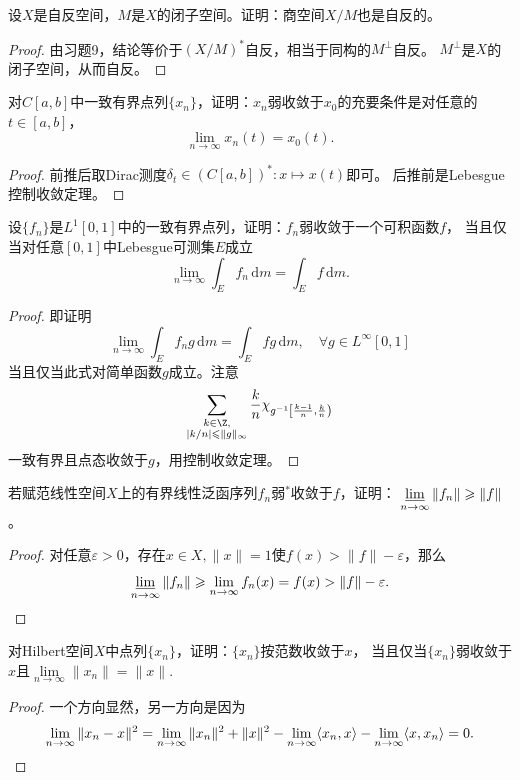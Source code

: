 \begin{11}
    设$X$是自反空间，$M$是$X$的闭子空间。证明：商空间$X/M$也是自反的。
\end{11}
\begin{proof}
    由习题9，结论等价于$(X/M)^*$自反，相当于同构的$M^\perp$自反。
    $M^\perp$是$X$的闭子空间，从而自反。
\end{proof}

\begin{12}
    对$C[a,b]$中一致有界点列$\{x_n\}$，证明：$x_n$弱收敛于$x_0$的充要条件是对任意的$t\in[a,b]$，
    \[\lim_{n\to\infty}x_n(t)=x_0(t).\]
\end{12}
\begin{proof}
    前推后取Dirac测度$\delta_t\in(C[a,b])^*\colon x \mapsto x(t)$即可。
    后推前是Lebesgue控制收敛定理。
\end{proof}

\begin{13}
    设$\{f_n\}$是$L^1[0,1]$中的一致有界点列，证明：$f_n$弱收敛于一个可积函数$f$，
    当且仅当对任意$[0,1]$中Lebesgue可测集$E$成立
    $$\lim_{n\to\infty}\int_Ef_n\,\mathrm{d}m=\int_Ef\,\mathrm{d}m.$$
\end{13}
\begin{proof}
    即证明$$\lim_{n\to\infty}\int_Ef_ng\,\mathrm{d}m=\int_Efg\,\mathrm{d}m,
    \quad\forall g\in L^\infty[0,1]$$
    当且仅当此式对简单函数$g$成立。注意
    $$\sum_{\begin{subarray}{c}k\in\Z,\\|k/n|\leqslant\|g\|_\infty\end{subarray}}
    \frac{k}{n}\chi_{g^{-1}\left[\frac{k-1}{n},\frac{k}{n}\right)}$$
    一致有界且点态收敛于$g$，用控制收敛定理。
\end{proof}

\begin{17}
    若赋范线性空间$X$上的有界线性泛函序列$f_n$弱$^*$收敛于$f$，证明：
    $\varliminf\limits_{n\to\infty}\|f_n\|\geqslant\|f\|$。
\end{17}
\begin{proof}
    对任意$\varepsilon>0$，存在$x\in X,\|x\|=1$使$f(x)>\|f\|-\varepsilon$，那么
    \[\varliminf_{n\to\infty}\|f_n\|\geqslant\lim_{n\to\infty}f_n(x)
    =f(x)>\|f\|-\varepsilon.\qedhere\]
\end{proof}

\begin{18}
    对Hilbert空间$X$中点列$\{x_n\}$，证明：$\{x_n\}$按范数收敛于$x$，
    当且仅当$\{x_n\}$弱收敛于$x$且$\lim\limits_{n\to\infty}\|x_n\|=\|x\|$.
\end{18}
\begin{proof}
    一个方向显然，另一方向是因为
    \[\lim_{n\to\infty}\|x_n-x\|^2
    =\lim_{n\to\infty}\|x_n\|^2+\|x\|^2-\lim_{n\to\infty}\langle x_n,x\rangle
    -\lim_{n\to\infty}\langle x,x_n\rangle=0.\qedhere\]
\end{proof}

